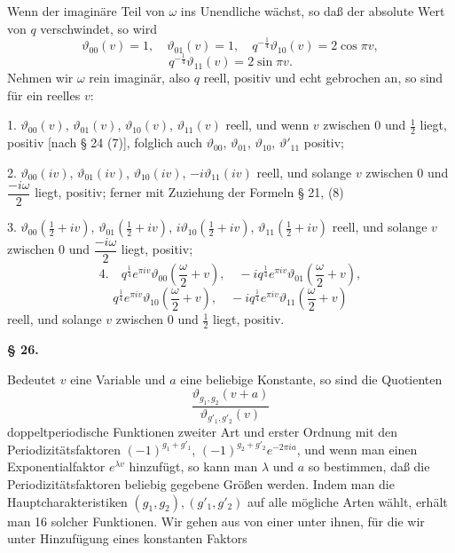 Wenn der imaginäre Teil von $\omega$ ins Unendliche wächst, so
daß der absolute Wert von $q$ verschwindet, so wird
\[
\vartheta_{00}(v) = 1, \quad \vartheta_{01}(v) = 1, \quad q^{-\frac{1}{4}}\vartheta_{10}(v) = 2\cos\pi v,
\]
\[
q^{-\frac{1}{4}}\vartheta_{11}(v) = 2\sin\pi v.
\]
Nehmen wir $\omega$ rein imaginär, also $q$ reell, positiv und echt
gebrochen an, so sind für ein reelles $v$:

1. $\vartheta_{00}(v)$, $\vartheta_{01}(v)$, $\vartheta_{10}(v)$, $\vartheta_{11}(v)$ reell, und wenn $v$ zwischen 0
und $\frac{1}{2}$ liegt, positiv [nach § 24 (7)], folglich auch $\vartheta_{00}$, $\vartheta_{01}$, $\vartheta_{10}$, $\vartheta'_{11}$
positiv;

2. $\vartheta_{00}(iv)$, $\vartheta_{01}(iv)$, $\vartheta_{10}(iv)$, $-i\vartheta_{11}(iv)$ reell, und solange $v$
zwischen 0 und $\dfrac{-i\omega}{2}$ liegt, positiv; ferner mit Zuziehung der
Formeln § 21, (8)

3. $\vartheta_{00}(\frac{1}{2}+iv)$, $\vartheta_{01}(\frac{1}{2}+iv)$, $i\vartheta_{10}(\frac{1}{2}+iv)$, $\vartheta_{11}(\frac{1}{2}+iv)$
reell, und solange $v$ zwischen 0 und $\dfrac{-i\omega}{2}$ liegt, positiv;
\[
4. \quad q^{\frac{1}{4}}e^{\pi iv}\vartheta_{00}\left(\frac{\omega}{2}+v\right), \quad -iq^{\frac{1}{4}}e^{\pi iv}\vartheta_{01}\left(\frac{\omega}{2}+v\right),
\]
\[
q^{\frac{1}{4}}e^{\pi iv}\vartheta_{10}\left(\frac{\omega}{2}+v\right), \quad -iq^{\frac{1}{4}}e^{\pi iv}\vartheta_{11}\left(\frac{\omega}{2}+v\right)
\]
reell, und solange $v$ zwischen 0 und $\frac{1}{2}$ liegt, positiv.

\begin{center}
\textbf{§ 26. }
\end{center}

Bedeutet $v$ eine Variable und $a$ eine beliebige Konstante, so
sind die Quotienten
\[
\frac{\vartheta_{g_1,g_2}(v+a)}{\vartheta_{g'_1,g'_2}(v)}
\]
doppeltperiodische Funktionen zweiter Art und erster Ordnung
mit den Periodizitätsfaktoren $(-1)^{g_1+g'_1}$, $(-1)^{g_2+g'_2}e^{-2\pi ia}$, und
wenn man einen Exponentialfaktor $e^{\lambda v}$ hinzufügt, so kann man $\lambda$
und $a$ so bestimmen, daß die Periodizitätsfaktoren beliebig gegebene Größen werden. Indem man die Hauptcharakteristiken
$(g_1,g_2), (g'_1,g'_2)$ auf alle mögliche Arten wählt, erhält man 16 solcher
Funktionen. Wir gehen aus von einer unter ihnen, für die wir
unter Hinzufügung eines konstanten Faktors
